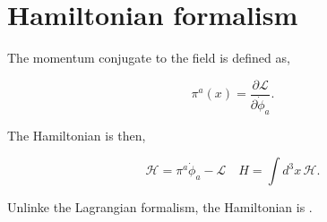 \section{Hamiltonian formalism}
The momentum conjugate to the field is defined as,
\begin{definition}
  \begin{equation}
    \pi^a(x) = \frac{\partial\mathcal{L}}{\partial \dot \phi_a}.
  \end{equation}
  \vspace{-0.5cm}
\end{definition}
The Hamiltonian is then, 
\begin{definition}
  \begin{equation}
    \mathcal{H} = \pi^a\dot\phi_a - \mathcal{L} \quad H = \int d^3x\, \mathcal{H}. 
  \end{equation}
  \vspace{-0.5cm}
\end{definition}
Unlinke the Lagrangian formalism, the Hamiltonian is . 
